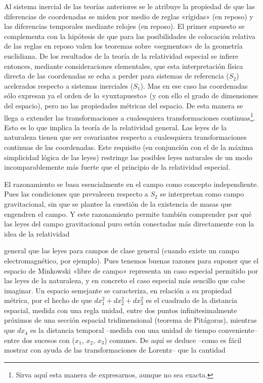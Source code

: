 \documentclass[spanish]{book}
\begin{document}
Al sistema inercial de las teorías anteriores se le atribuye la propiedad de que las
diferencias de coordenadas se miden por medio de reglas «rígidas» (en reposo) y las
diferencias temporales mediante relojes (en reposo). El primer supuesto se
complementa con la hipótesis de que para las posibilidades de colocación relativa de
las reglas en reposo valen los teoremas sobre «segmentos» de la geometría euclidiana.
De los resultados de la teoría de la relatividad especial se infiere entonces, mediante
consideraciones elementales, que esta interpretación física directa de las coordenadas
se echa a perder para sistemas de referencia ($S_{2}$) acelerados respecto a sistemas
inerciales ($S_{1}$). Mas en ese caso las coordenadas sólo expresan ya el orden de lo «yuxtapuesto» 
(y con ello el grado de dimensiones del espacio), pero no las propiedades
métricas del espacio. De esta manera se llega a extender las transformaciones a
cualesquiera transformaciones continuas\footnote{Sirva aquí esta manera de expresarnos,
aunque no sea exacta.}. Esto es lo que implica la teoría de la
relatividad general. Las leyes de la naturaleza tienen que ser covariantes respecto a
cualesquiera transformaciones continuas de las coordenadas. Este requisito (en
conjunción con el de la máxima simplicidad lógica de las leyes) restringe las
posibles leyes naturales de un modo incomparablemente más fuerte que el principio
de la relatividad especial.

  El razonamiento se basa esencialmente en el campo como concepto independiente.
Pues las condiciones que prevalecen respecto a $S_{2}$ se interpretan como campo
gravitacional, sin que se plantee la cuestión de la existencia de masas que engendren el
campo. Y este razonamiento permite también comprender por qué las leyes del campo
gravitacional puro están conectadas más directamente con la idea de la relatividad

general que las leyes para campos de clase general (cuando existe un campo
electromagnético, por ejemplo). Pues tenemos buenas razones para suponer que el
espacio de Minkowski «libre de campo» representa un caso especial permitido por las
leyes de la naturaleza, y en concreto el caso especial más sencillo que cabe imaginar.
Un espacio semejante se caracteriza, en relación a su propiedad métrica, por el hecho
de que $dx_{1}^{2} + dx_{2}^{2} + dx_{3}^{2}$ es el cuadrado de la distancia espacial, medida con una regla
unidad, entre dos puntos infinitesimalmente próximos de una sección espacial
tridimensional (teorema de Pitágoras), mientras que $dx_{4}$ es la distancia temporal
--medida con una unidad de tiempo conveniente-- entre dos sucesos con ($x_{1}$, $x_{2}$, $x_{3}$)
comunes. De aquí se deduce --como es fácil mostrar con ayuda de las
transformaciones de Lorentz-- que la cantidad
\end{document}
